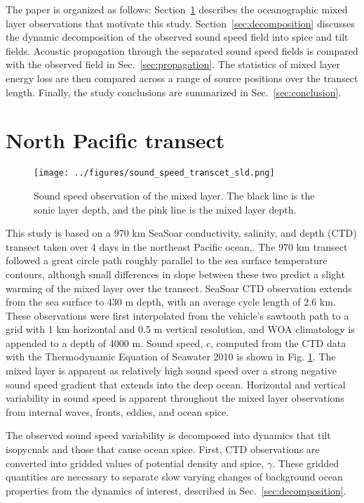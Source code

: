 \documentclass[preprint,NumberedRefs]{JASA}
\begin{document}
The paper is organized as follows: Section~\ref{sec:transcet} describes the oceanographic mixed layer observations that motivate this study. Section~\ref{sec:decomposition} discusses the dynamic decomposition of the observed sound speed field into spice and tilt fields. Acoustic propagation through the separated sound speed fields is compared with the observed field in Sec.~\ref{sec:propagation}. The statistics of mixed layer energy loss are then compared across a range of source positions over the transect length. Finally, the study conclusions are summarized in Sec.~\ref{sec:conclusion}.

\section{North Pacific transect}\label{sec:transcet}
\begin{figure}
\texttt{[image: ../figures/sound\_speed\_transcet\_sld.png]}
\caption{\label{fig:c_grid}{Sound speed observation of the mixed layer. The black line is the sonic layer depth, and the pink line is the mixed layer depth.}}
\end{figure}

This study is based on a 970 km SeaSoar conductivity, salinity, and depth (CTD) transect taken over 4 days in the northeast Pacific ocean,\citep{cole2010seasonal}. The 970 km transect followed a great circle path roughly parallel to the sea surface temperature contours, although small differences in slope between these two predict a slight warming of the mixed layer over the transect. SeaSoar CTD observation extends from the sea surface to 430 m depth, with an average cycle length of 2.6 km. These observations were first interpolated from the vehicle's sawtooth path to a grid with 1 km horizontal and 0.5 m vertical resolution\citep{colosi2020observations}, and WOA climatology is appended to a depth of 4000 m\citep{WOA}. Sound speed, $c$, computed from the CTD data with the Thermodynamic Equation of Seawater 2010\cite{TEOS-10} is shown in Fig. \ref{fig:c_grid}. The mixed layer is apparent as relatively high sound speed over a strong negative sound speed gradient that extends into the deep ocean. Horizontal and vertical variability in sound speed is apparent throughout the mixed layer observations from internal waves, fronts, eddies, and ocean spice\citep{colosi2020observations}.

The observed sound speed variability is decomposed into dynamics that tilt isopycnals and those that cause ocean spice. First, CTD observations are converted into gridded values of potential density and spice, $\gamma$. These gridded quantities are necessary to separate slow varying changes of background ocean properties from the dynamics of interest\cite{dzieciuch2004}, described in Sec.~\ref{sec:decomposition}.
\end{document}
